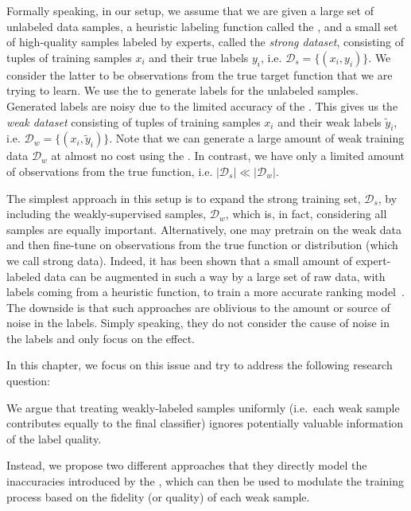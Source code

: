 Formally speaking, in our setup, we assume that we are given a large set of unlabeled data samples, a heuristic labeling function called the \emph{\wa}, and a small set of high-quality samples labeled by experts, called the \emph{strong dataset}, consisting of tuples of training samples $x_i$ and their true labels $y_i$, i.e. $\mathcal{D}_s=\{(x_i,y_i)\}$. We consider the latter to be observations from the true target function that we are trying to learn. 
We use the \wa to generate labels for the unlabeled samples. Generated labels are noisy due to the limited accuracy of the \wa. This gives us the \emph{weak dataset} consisting of tuples of training samples $x_i$ and their weak labels $\tilde{y}_i$, i.e. $\mathcal{D}_w=\{(x_i, \tilde{y}_i)\}$.  Note that we can generate a large amount of weak training data $\mathcal{D}_w$ at almost no cost using the \wa. In contrast, we have only a limited amount of observations from the true function, i.e. $|\mathcal{D}_s| \ll |\mathcal{D}_w|$. 

The simplest approach in this setup is to expand the strong training set, $\mathcal{D}_s$, by including the weakly-supervised samples, $\mathcal{D}_w$, which is, in fact, considering all samples are equally important. Alternatively, one may pretrain on the weak data and then fine-tune on observations from the true function or distribution (which we call strong data). Indeed, it has been shown that a small amount of expert-labeled data can be augmented in such a way by a large set of raw data, with labels coming from a heuristic function, to train a more accurate ranking model~\citep{Dehghani:2017:SIGIR, Severyn:2015:SIGIR}.
The downside is that such approaches are oblivious to the amount or source of noise in the labels. Simply speaking, they do not consider the cause of noise in the labels and only focus on the effect. 

In this chapter, we focus on this issue and try to address the following research question:

We argue that treating weakly-labeled samples uniformly (i.e.\ each weak sample contributes equally to the final classifier) ignores potentially valuable information of the label quality. 

Instead, we propose two different approaches that they directly model the inaccuracies introduced by the \wa, which can then be used to modulate the training process based on the fidelity (or quality) of each weak sample. 


